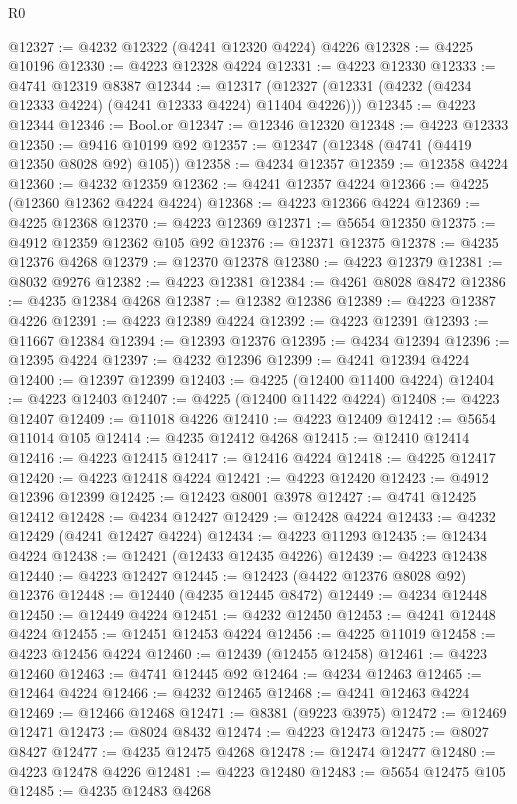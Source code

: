 \begin{lexlean}{R0}
\begin{coremodule}
@12327 := @4232 @12322 (@4241 @12320 @4224) @4226
@12328 := @4225 @10196
@12330 := @4223 @12328 @4224
@12331 := @4223 @12330
@12333 := @4741 @12319 @8387
@12344 := @12317 (@12327 (@12331 (@4232 (@4234 @12333 @4224) (@4241 @12333 @4224) @11404 @4226)))
@12345 := @4223 @12344
@12346 := Bool.or
@12347 := @12346 @12320
@12348 := @4223 @12333
@12350 := @9416 @10199 @92
@12357 := @12347 (@12348 (@4741 (@4419 @12350 @8028 @92) @105))
@12358 := @4234 @12357
@12359 := @12358 @4224
@12360 := @4232 @12359
@12362 := @4241 @12357 @4224
@12366 := @4225 (@12360 @12362 @4224 @4224)
@12368 := @4223 @12366 @4224
@12369 := @4225 @12368
@12370 := @4223 @12369
@12371 := @5654 @12350
@12375 := @4912 @12359 @12362 @105 @92
@12376 := @12371 @12375
@12378 := @4235 @12376 @4268
@12379 := @12370 @12378
@12380 := @4223 @12379
@12381 := @8032 @9276
@12382 := @4223 @12381
@12384 := @4261 @8028 @8472
@12386 := @4235 @12384 @4268
@12387 := @12382 @12386
@12389 := @4223 @12387 @4226
@12391 := @4223 @12389 @4224
@12392 := @4223 @12391
@12393 := @11667 @12384
@12394 := @12393 @12376
@12395 := @4234 @12394
@12396 := @12395 @4224
@12397 := @4232 @12396
@12399 := @4241 @12394 @4224
@12400 := @12397 @12399
@12403 := @4225 (@12400 @11400 @4224)
@12404 := @4223 @12403
@12407 := @4225 (@12400 @11422 @4224)
@12408 := @4223 @12407
@12409 := @11018 @4226
@12410 := @4223 @12409
@12412 := @5654 @11014 @105
@12414 := @4235 @12412 @4268
@12415 := @12410 @12414
@12416 := @4223 @12415
@12417 := @12416 @4224
@12418 := @4225 @12417
@12420 := @4223 @12418 @4224
@12421 := @4223 @12420
@12423 := @4912 @12396 @12399
@12425 := @12423 @8001 @3978
@12427 := @4741 @12425 @12412
@12428 := @4234 @12427
@12429 := @12428 @4224
@12433 := @4232 @12429 (@4241 @12427 @4224)
@12434 := @4223 @11293
@12435 := @12434 @4224
@12438 := @12421 (@12433 @12435 @4226)
@12439 := @4223 @12438
@12440 := @4223 @12427
@12445 := @12423 (@4422 @12376 @8028 @92) @12376
@12448 := @12440 (@4235 @12445 @8472)
@12449 := @4234 @12448
@12450 := @12449 @4224
@12451 := @4232 @12450
@12453 := @4241 @12448 @4224
@12455 := @12451 @12453 @4224
@12456 := @4225 @11019
@12458 := @4223 @12456 @4224
@12460 := @12439 (@12455 @12458)
@12461 := @4223 @12460
@12463 := @4741 @12445 @92
@12464 := @4234 @12463
@12465 := @12464 @4224
@12466 := @4232 @12465
@12468 := @4241 @12463 @4224
@12469 := @12466 @12468
@12471 := @8381 (@9223 @3975)
@12472 := @12469 @12471
@12473 := @8024 @8432
@12474 := @4223 @12473
@12475 := @8027 @8427
@12477 := @4235 @12475 @4268
@12478 := @12474 @12477
@12480 := @4223 @12478 @4226
@12481 := @4223 @12480
@12483 := @5654 @12475 @105
@12485 := @4235 @12483 @4268

\end{coremodule}
\end{lexlean}
